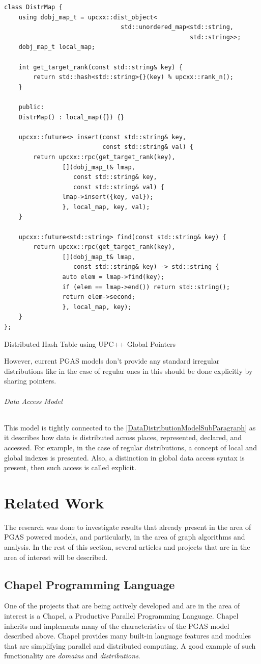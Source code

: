 \documentclass[14pt]{extreport}
\newcommand\blankpage{
    \null
    \thispagestyle{empty}
    \newpage
    }
\begin{document}
\begin{listing}[H]
\begin{verbatim}
class DistrMap {
	using dobj_map_t = upcxx::dist_object<
								std::unordered_map<std::string,	
												   std::string>>;
	dobj_map_t local_map;

	int get_target_rank(const std::string& key) {
		return std::hash<std::string>{}(key) % upcxx::rank_n();
	}

	public:
	DistrMap() : local_map({}) {}

	upcxx::future<> insert(const std::string& key, 
						   const std::string& val) {
		return upcxx::rpc(get_target_rank(key),
				[](dobj_map_t& lmap, 
				   const std::string& key, 
				   const std::string& val) {
				lmap->insert({key, val});
				}, local_map, key, val);
	}

	upcxx::future<std::string> find(const std::string& key) {
		return upcxx::rpc(get_target_rank(key),
				[](dobj_map_t& lmap, 
				   const std::string& key) -> std::string {
				auto elem = lmap->find(key);
				if (elem == lmap->end()) return std::string();
				return elem->second;
				}, local_map, key);
	}
};
\end{verbatim}
\caption{Distributed Hash Table using UPC++ Global Pointers}
\end{listing}

However, current PGAS models don't provide any standard irregular distributions like in the case of regular ones in this should be done explicitly by sharing pointers.

\subparagraph{Data Access Model}
This model is tightly connected to the \ref{DataDistributionModelSubParagraph} as it describes how data is distributed across places, represented, declared, and accessed. For example, in the case of regular distributions, a concept of local and global indexes is presented. Also, a distinction in global data access syntax is present, then such access is called explicit.

\blankpage
\chapter{Related Work}
The research was done to investigate results that already present in the area of PGAS powered models, and particularly, in the area of graph algorithms and analysis. In the rest of this section, several articles and projects that are in the area of interest will be described.
\section{Chapel Programming Language}
One of the projects that are being actively developed and are in the area of interest is a Chapel, a Productive Parallel Programming Language. Chapel inherits and implements many of the characteristics of the PGAS model described above. Chapel provides many built-in language features and modules that are simplifying parallel and distributed computing. A good example of such functionality are \textit{domains} and \textit{distributions}.
\end{document}
